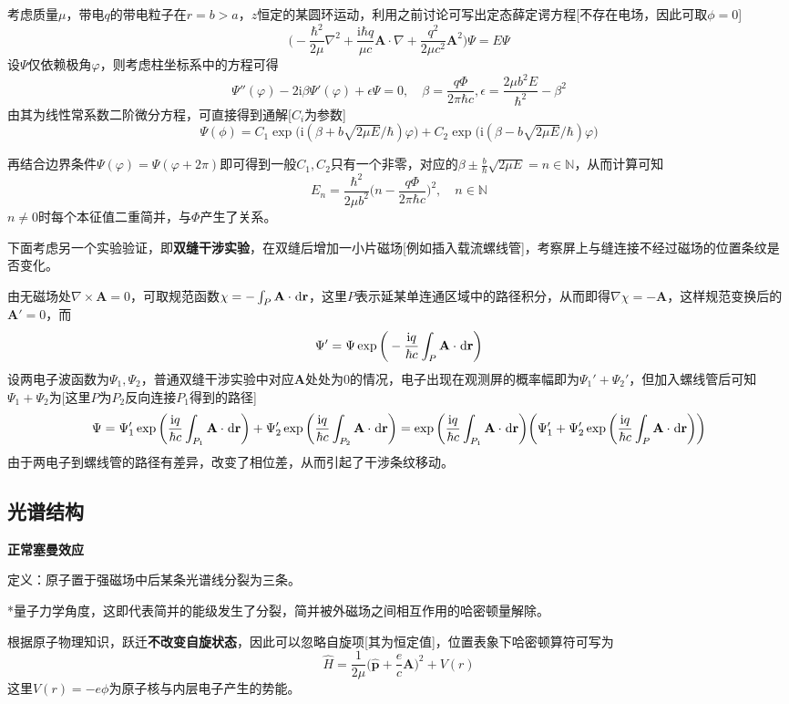 \documentclass[a4paper,UTF8,fontset=windows]{ctexart}
\newcommand*{\dr}{\hspace{0.07em}\mathrm{d}}
\newcommand*{\ir}{\mathrm{i}}
\newcommand*{\br}{\mathbf{r}}
\newcommand*{\bp}{\mathbf{p}}
\newcommand*{\ba}{\mathbf{A}}
\begin{document}
考虑质量$\mu$，带电$q$的带电粒子在$r=b>a$，$z$恒定的某圆环运动，利用之前讨论可写出定态薛定谔方程[不存在电场，因此可取$\phi=0$]
$$\bigg(-\frac{\hbar^2}{2\mu}\nabla^2+\frac{\ir\hbar q}{\mu c}\ba\cdot\nabla+\frac{q^2}{2\mu c^2}\ba^2\bigg)\Psi=E\Psi$$
设$\Psi$仅依赖极角$\varphi$，则考虑柱坐标系中的方程可得
$$\Psi''(\varphi)-2\ir\beta\Psi'(\varphi)+\epsilon\Psi=0,\quad\beta=\frac{q\Phi}{2\pi\hbar c},\epsilon=\frac{2\mu b^2E}{\hbar^2}-\beta^2$$
由其为线性常系数二阶微分方程，可直接得到通解[$C_i$为参数]
$$\Psi(\phi)=C_1\exp\big(\ir(\beta+b\sqrt{2\mu E}/\hbar)\varphi\big)+C_2\exp\big(\ir(\beta-b\sqrt{2\mu E}/\hbar)\varphi\big)$$

再结合边界条件$\Psi(\varphi)=\Psi(\varphi+2\pi)$即可得到一般$C_1,C_2$只有一个非零，对应的$\beta\pm\frac{b}{\hbar}\sqrt{2\mu E}=n\in\mathbb{N}$，从而计算可知
$$E_n=\frac{\hbar^2}{2\mu b^2}\bigg(n-\frac{q\Phi}{2\pi\hbar c}\bigg)^2,\quad n\in\mathbb{N}$$
$n\ne0$时每个本征值二重简并，与$\Phi$产生了关系。

下面考虑另一个实验验证，即\textbf{双缝干涉实验}，在双缝后增加一小片磁场[例如插入载流螺线管]，考察屏上与缝连接不经过磁场的位置条纹是否变化。

由无磁场处$\nabla\times\ba=0$，可取规范函数$\chi=-\int_P\ba\cdot\dr\br$，这里$P$表示延某单连通区域中的路径积分，从而即得$\nabla\chi=-\ba$，这样规范变换后的$\ba'=0$，而
$$\Psi'=\Psi\exp\bigg(-\frac{\ir q}{\hbar c}\int_P\ba\cdot\dr\br\bigg)$$
设两电子波函数为$\Psi_1,\Psi_2$，普通双缝干涉实验中对应$\ba$处处为0的情况，电子出现在观测屏的概率幅即为$\Psi_1'+\Psi_2'$，但加入螺线管后可知$\Psi_1+\Psi_2$为[这里$P$为$P_2$反向连接$P_1$得到的路径]
$$\Psi=\Psi_1'\exp\bigg(\frac{\ir q}{\hbar c}\int_{P_1}\ba\cdot\dr\br\bigg)+\Psi_2'\exp\bigg(\frac{\ir q}{\hbar c}\int_{P_2}\ba\cdot\dr\br\bigg)=\exp\bigg(\frac{\ir q}{\hbar c}\int_{P_1}\ba\cdot\dr\br\bigg)\bigg(\Psi_1'+\Psi_2'\exp\bigg(\frac{\ir q}{\hbar c}\int_P\ba\cdot\dr\br\bigg)\bigg)$$
由于两电子到螺线管的路径有差异，改变了相位差，从而引起了干涉条纹移动。

\subsection{光谱结构}
\textbf{正常塞曼效应}

定义：原子置于强磁场中后某条光谱线分裂为三条。

*量子力学角度，这即代表简并的能级发生了分裂，简并被外磁场之间相互作用的哈密顿量解除。

根据原子物理知识，跃迁\textbf{不改变自旋状态}，因此可以忽略自旋项[其为恒定值]，位置表象下哈密顿算符可写为
$$\hat{H}=\frac{1}{2\mu}\bigg(\hat{\bp}+\frac{e}{c}\ba\bigg)^2+V(r)$$
这里$V(r)=-e\phi$为原子核与内层电子产生的势能。
\end{document}
